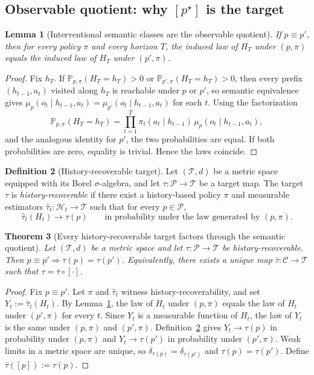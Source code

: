 \documentclass[11pt]{article}
\newtheorem{theorem}{Theorem}[section]
\newtheorem{lemma}[theorem]{Lemma}
\theoremstyle{definition}
\newtheorem{definition}[theorem]{Definition}
\theoremstyle{remark}
\newcommand{\Ccal}{\mathcal{C}}
\newcommand{\Pcal}{\mathcal{P}}
\newcommand{\Hcal}{\mathcal{H}}
\newcommand{\Prob}{\mathbb{P}}
\begin{document}
\subsection{Observable quotient: why $[p^\star]$ is the target}

\begin{lemma}[Interventional semantic classes are the observable quotient]
\label{lem:observable-quotient}
If $p\equiv p'$, then for every policy $\pi$ and every horizon $T$, the induced law of $H_T$ under $(p,\pi)$ equals the induced law of $H_T$ under $(p',\pi)$.
\end{lemma}

\begin{proof}
Fix $h_T$. If $\Prob_{p,\pi}(H_T=h_T)>0$ or $\Prob_{p',\pi}(H_T=h_T)>0$, then every prefix $(h_{t-1},a_t)$ visited along $h_T$ is reachable under $p$ or $p'$, so semantic equivalence gives $\mu_p(o_t\mid h_{t-1},a_t)=\mu_{p'}(o_t\mid h_{t-1},a_t)$ for each $t$. Using the factorization
\[
\Prob_{p,\pi}(H_T=h_T)
=
\prod_{t=1}^{T}\pi_t(a_t\mid h_{t-1})\,\mu_p(o_t\mid h_{t-1},a_t),
\]
and the analogous identity for $p'$, the two probabilities are equal. If both probabilities are zero, equality is trivial. Hence the laws coincide.
\end{proof}

\begin{definition}[History-recoverable target]
\label{def:history-recoverable}
Let $(\mathcal{T},d)$ be a metric space equipped with its Borel $\sigma$-algebra, and let $\tau:\Pcal\to\mathcal{T}$ be a target map. The target $\tau$ is \emph{history-recoverable} if there exist a history-based policy $\pi$ and measurable estimators $\hat\tau_t:\Hcal_t\to\mathcal{T}$ such that for every $p\in\Pcal$,
\[
\hat\tau_t(H_t)\longrightarrow \tau(p)
\qquad
\text{in probability under the law generated by } (p,\pi).
\]
\end{definition}

\begin{theorem}[Every history-recoverable target factors through the semantic quotient]
\label{thm:factor-through-quotient}
Let $(\mathcal{T},d)$ be a metric space and let $\tau:\Pcal\to\mathcal{T}$ be history-recoverable. Then $p\equiv p'\Rightarrow\tau(p)=\tau(p')$. Equivalently, there exists a unique map $\bar\tau:\Ccal\to\mathcal{T}$ such that $\tau=\bar\tau\circ[\cdot]$.
\end{theorem}

\begin{proof}
Fix $p\equiv p'$. Let $\pi$ and $\hat\tau_t$ witness history-recoverability, and set $Y_t:=\hat\tau_t(H_t)$. By Lemma~\ref{lem:observable-quotient}, the law of $H_t$ under $(p,\pi)$ equals the law of $H_t$ under $(p',\pi)$ for every $t$. Since $Y_t$ is a measurable function of $H_t$, the law of $Y_t$ is the same under $(p,\pi)$ and $(p',\pi)$. Definition~\ref{def:history-recoverable} gives $Y_t\to\tau(p)$ in probability under $(p,\pi)$ and $Y_t\to\tau(p')$ in probability under $(p',\pi)$. Weak limits in a metric space are unique, so $\delta_{\tau(p)}=\delta_{\tau(p')}$ and $\tau(p)=\tau(p')$. Define $\bar\tau([p]):=\tau(p)$.
\end{proof}
\end{document}
